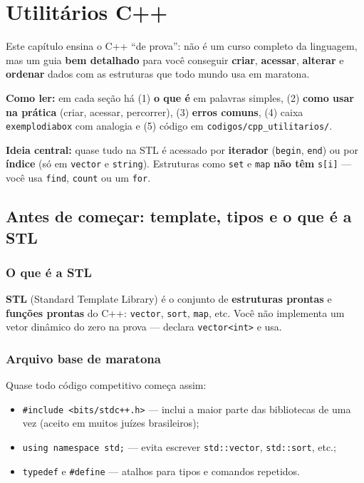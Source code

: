 \chapter{Utilitários C++}

Este capítulo ensina o C++ ``de prova'': não é um curso completo da linguagem, mas um guia \textbf{bem detalhado} para você conseguir \textbf{criar}, \textbf{acessar}, \textbf{alterar} e \textbf{ordenar} dados com as estruturas que todo mundo usa em maratona.

\textbf{Como ler:} em cada seção há (1) \textbf{o que é} em palavras simples, (2) \textbf{como usar na prática} (criar, acessar, percorrer), (3) \textbf{erros comuns}, (4) caixa \texttt{exemplodiabox} com analogia e (5) código em \texttt{codigos/cpp\_utilitarios/}.

\medskip
\noindent\textbf{Ideia central:} quase tudo na STL é acessado por \textbf{iterador} (\texttt{begin}, \texttt{end}) ou por \textbf{índice} (só em \texttt{vector} e \texttt{string}). Estruturas como \texttt{set} e \texttt{map} \textbf{não têm} \texttt{s[i]} --- você usa \texttt{find}, \texttt{count} ou um \texttt{for}.

\section{Antes de começar: template, tipos e o que é a STL}

\subsection{O que é a STL}

\textbf{STL} (Standard Template Library) é o conjunto de \textbf{estruturas prontas} e \textbf{funções prontas} do C++: \texttt{vector}, \texttt{sort}, \texttt{map}, etc.
Você não implementa um vetor dinâmico do zero na prova --- declara \texttt{vector<int>} e usa.

\subsection{Arquivo base de maratona}

Quase todo código competitivo começa assim:

\begin{itemize}[nosep]
  \item \texttt{\#include <bits/stdc++.h>} --- inclui a maior parte das bibliotecas de uma vez (aceito em muitos juízes brasileiros);
  \item \texttt{using namespace std;} --- evita escrever \texttt{std::vector}, \texttt{std::sort}, etc.;
  \item \texttt{typedef} e \texttt{\#define} --- atalhos para tipos e comandos repetidos.
\end{itemize}

